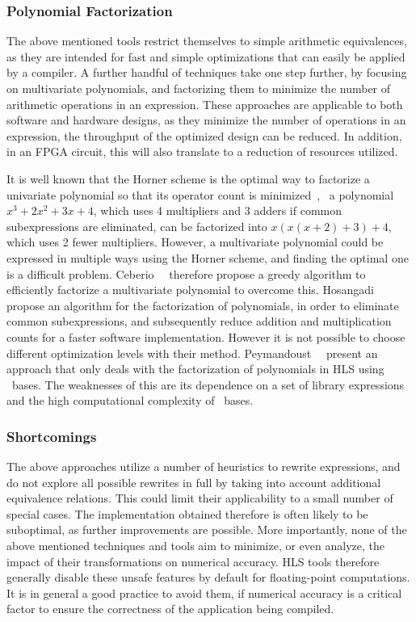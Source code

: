 \subsubsection{Polynomial Factorization}

The above mentioned tools restrict themselves to simple arithmetic
equivalences, as they are intended for fast and simple optimizations that
can easily be applied by a compiler.  A further handful of techniques take
one step further, by focusing on multivariate polynomials, and factorizing
them to minimize the number of arithmetic operations in an expression.  These
approaches are applicable to both software and hardware designs, as they
minimize the number of operations in an expression, the throughput of the
optimized design can be reduced.  In addition, in an FPGA circuit, this will
also translate to a reduction of resources utilized.

It is well known that the Horner scheme is the optimal way to
factorize a univariate polynomial so that its operator count is
minimized~\cite{neumaier01}, \eg~a polynomial $x^3 + 2x^2 + 3x + 4$,
which uses 4 multipliers and 3 adders if common subexpressions are
eliminated, can be factorized into $x(x(x + 2) + 3) + 4$, which uses 2
fewer multipliers.  However, a multivariate polynomial could be expressed
in multiple ways using the Horner scheme, and finding the optimal one is
a difficult problem.  Ceberio~\etal~\cite{ceberio04} therefore propose a
greedy algorithm to efficiently factorize a multivariate polynomial to
overcome this.  Hosangadi~\etal~\cite{hosangadi} propose an algorithm for the
factorization of polynomials, in order to eliminate common subexpressions, and
subsequently reduce addition and multiplication counts for a faster software
implementation.  However it is not possible to choose different optimization
levels with their method.  Peymandoust~\etal~\cite{peymandoust} present an
approach that only deals with the factorization of polynomials in HLS using
\groebner~bases.  The weaknesses of this are its dependence on a set of
library expressions~\cite{hosangadi} and the high computational complexity of
\groebner~bases.

\subsubsection{Shortcomings}

The above approaches utilize a number of heuristics to rewrite expressions, and
do not explore all possible rewrites in full by taking into account additional
equivalence relations.  This could limit their applicability to a small number
of special cases.  The implementation obtained therefore is often likely
to be suboptimal, as further improvements are possible.  More importantly,
none of the above mentioned techniques and tools aim to minimize, or even
analyze, the impact of their transformations on numerical accuracy.  HLS tools
therefore generally disable these unsafe features by default for floating-point
computations.  It is in general a good practice to avoid them, if numerical
accuracy is a critical factor to ensure the correctness of the application
being compiled.

